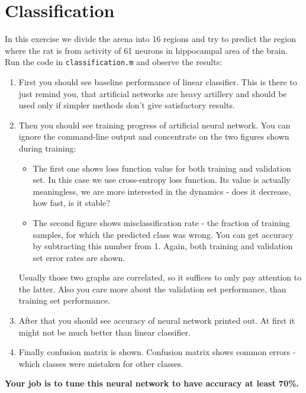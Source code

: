 \documentclass[a4paper,11pt]{article}
\begin{document}
%
%
\section{Classification}

In this exercise we divide the arena into 16 regions and try to predict the region where the rat is from activity of 61 neurons in hippocampal area of the brain.\\

Run the code in \texttt{classification.m} and observe the results:

\begin{enumerate}
	\item First you should see baseline performance of linear classifier. This is there to just remind you, that artificial networks are heavy artillery and should be used only if simpler methods don't give satisfactory results. 
	\item Then you should see training progress of artificial neural network. You can ignore the command-line output and concentrate on the two figures shown during training:
	\begin{itemize}
		\item The first one shows loss function value for both training and validation set. In this case we use cross-entropy loss function. Its value is actually meaningless, we are more interested in the dynamics - does it decrease, how fast, is it stable?
		\item The second figure shows misclassification rate - the fraction of training samples, for which the predicted class was wrong. You can get accuracy by subtracting this number from 1. Again, both training and validation set error rates are shown.
	\end{itemize}
	Usually those two graphs are correlated, so it suffices to only pay attention to the latter. Also you care more about the validation set performance, than training set performance.
	\item After that you should see accuracy of neural network printed out. At first it might not be much better than linear classifier.
	\item Finally confusion matrix is shown. Confusion matrix shows common errors - which classes were mistaken for other classes.
\end{enumerate}

\textbf{Your job is to tune this neural network to have accuracy at least 70\%.}
\end{document}
